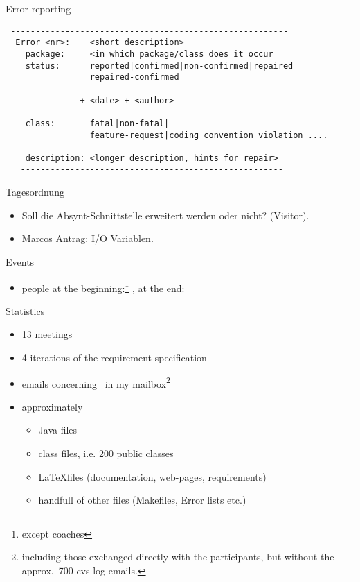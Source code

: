 \begin{myslide}{Error reporting}
{\footnotesize 

\begin{verbatim}
 --------------------------------------------------------
  Error <nr>:    <short description>
    package:     <in which package/class does it occur
    status:      reported|confirmed|non-confirmed|repaired
                 repaired-confirmed

               + <date> + <author>
   
    class:       fatal|non-fatal|
                 feature-request|coding convention violation ....

    description: <longer description, hints for repair>
   -----------------------------------------------------

\end{verbatim}
}
\end{myslide}
\begin{myslide}{Tagesordnung}
  \begin{itemize}
  \item Soll die Absynt-Schnittstelle erweitert werden oder nicht?
    (Visitor).
  \item Marcos Antrag: I/O Variablen.
  \end{itemize}
  
\end{myslide}

\begin{myslide}{Events}
  \begin{itemize}
  \item people at the beginning:\footnote{except coaches} ,
    at the end: 
  \end{itemize}
\end{myslide}


\begin{myslide}{Statistics}
  \begin{itemize}
  \item 13 meetings
  \item 4 iterations of the requirement specification
  \item {} emails concerning \Slime\ in my
    mailbox\footnote{including those exchanged directly with the
      participants, but without the approx.\ 700 cvs-log emails.}
  \item approximately
    \begin{itemize}
    \item {} Java files
    \item {} class files, i.e. 200 public classes
    \item {}  \LaTeX files (documentation, web-pages, requirements)
    \item handfull of other files (Makefiles, Error lists etc.)
    \end{itemize}
  \end{itemize}
  
\end{myslide}






